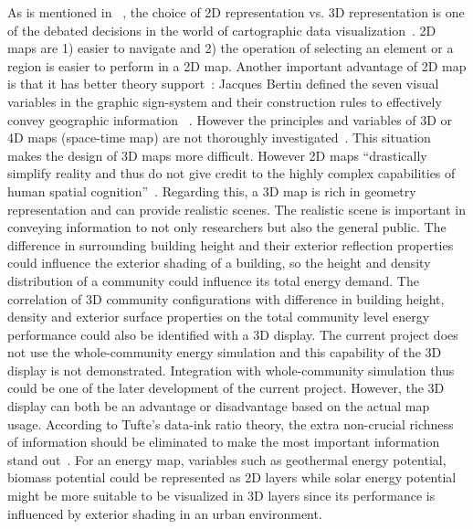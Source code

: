 As is mentioned in ~\cite{Brownrigg2005}, the choice of 2D
representation vs. 3D representation is one of the debated decisions
in the world of cartographic data
visualization~\cite{Brownrigg2005}. 2D maps are 1) easier to navigate
and 2) the operation of selecting an element or a region is easier to
perform in a 2D map. Another important advantage of 2D map is that it
has better theory support~\cite{Resch2014}: Jacques Bertin defined the
seven visual variables in the graphic sign-system and their
construction rules to effectively convey geographic information
~\cite{Bertin1983}. However the principles and variables of 3D or 4D
maps (space-time map) are not thoroughly
investigated~\cite{Resch2014}. This situation makes the design of 3D
maps more difficult. However 2D maps ``drastically simplify reality
and thus do not give credit to the highly complex capabilities of
human spatial cognition''~\cite{Resch2014}. Regarding this, a 3D map
is rich in geometry representation and can provide realistic
scenes. The realistic scene is important in conveying information to
not only researchers but also the general public. The difference in
surrounding building height and their exterior reflection properties
could influence the exterior shading of a building, so the height and
density distribution of a community could influence its total energy
demand. The correlation of 3D community configurations with difference
in building height, density and exterior surface properties on the
total community level energy performance could also be identified with
a 3D display. The current project does not use the whole-community
energy simulation and this capability of the 3D display is not
demonstrated. Integration with whole-community simulation thus could
be one of the later development of the current project. However, the
3D display can both be an advantage or disadvantage based on the
actual map usage. According to Tufte's data-ink ratio theory, the
extra non-crucial richness of information should be eliminated to make
the most important information stand out~\cite{Tufte83}. For an energy
map, variables such as geothermal energy potential, biomass potential
could be represented as 2D layers while solar energy potential might
be more suitable to be visualized in 3D layers since its performance
is influenced by exterior shading in an urban environment.


